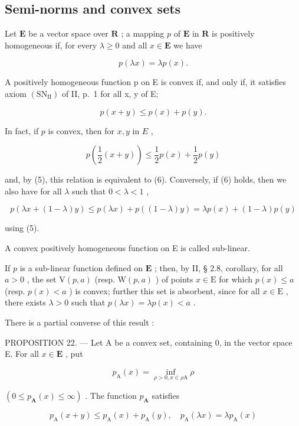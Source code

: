 \subsection{Semi-norms and convex sets}

Let \(\mathbf{E}\) be a vector space over \(\mathbf{R}\) ; a mapping \(p\) of \(\mathbf{E}\) in \(\mathbf{R}\) is positively homogeneous if, for every \(\lambda \geqslant 0\) and all \(x \in \mathbf{E}\) we have

\[
p (\lambda x) = \lambda p (x).\tag{5}
\]

A positively homogeneous function p on E is convex if, and only if, it satisfies axiom \((\mathrm{SN}_{\mathrm{II}})\) of II, p.~1 for all x, y of E;

\[
p (x + y) \leqslant p (x) + p (y).\tag{6}
\]

In fact, if \(p\) is convex, then for \(x, y\) in \(E\) ,

\[
p \left(\frac {1}{2} (x + y)\right) \leqslant \frac {1}{2} p (x) + \frac {1}{2} p (y)
\]

and, by (5), this relation is equivalent to (6). Conversely, if (6) holds, then we also have for all \(\lambda\) such that \(0 < \lambda < 1\) ,

\[
p (\lambda x + (1 - \lambda) y) \leqslant p (\lambda x) + p ((1 - \lambda) y) = \lambda p (x) + (1 - \lambda) p (y)
\]

using (5).

A convex positively homogeneous function on E is called sub-linear.

If \(p\) is a sub-linear function defined on \(\mathbf{E}\) ; then, by II, § 2.8, corollary, for all \(a > 0\) , the set \(\mathrm{V}(p, a)\) (resp. \(\mathrm{W}(p, a)\) ) of points \(x \in \mathrm{E}\) for which \(p(x) \leqslant a\) (resp. \(p(x) < a\) ) is convex; further this set is absorbent, since for all \(x \in \mathrm{E}\) , there exists \(\lambda > 0\) such that \(p(\lambda x) = \lambda p(x) < a\) .

There is a partial converse of this result :

PROPOSITION 22. --- Let A be a convex set, containing 0, in the vector space E. For all \(x \in \mathbf{E}\) , put

\[
p _ {\mathrm{A}} (x) = \inf _ {\rho > 0, x \in \rho \mathrm{A}} \rho\tag{7}
\]

\((0 \leqslant p_{\mathbf{A}}(x) \leqslant \infty)\) . The function \(p_{\mathbf{A}}\) satisfies

\[
p _ {\mathrm{A}} (x + y) \leqslant p _ {\mathrm{A}} (x) + p _ {\mathrm{A}} (y), \quad p _ {\mathrm{A}} (\lambda x) = \lambda p _ {\mathrm{A}} (x)\tag{8}
\]

